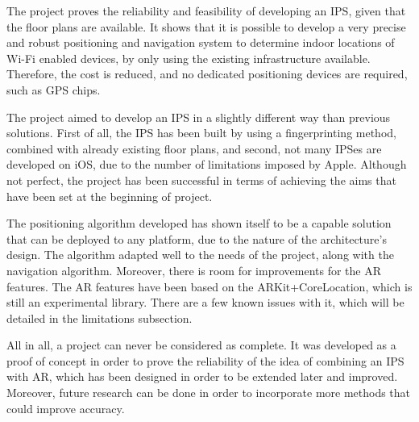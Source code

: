 The project proves the reliability and feasibility of developing an IPS, given that the floor plans are available. It shows that it is possible to develop a very precise and robust positioning and navigation system to determine indoor locations of Wi-Fi enabled devices, by only using the existing infrastructure available. Therefore, the cost is reduced, and no dedicated positioning devices are required, such as GPS chips.

The project aimed to develop an IPS in a slightly different way than previous solutions. First of all, the IPS has been built by using a fingerprinting method, combined with already existing floor plans, and second, not many IPSes are developed on iOS, due to the number of limitations imposed by Apple. Although not perfect, the project has been successful in terms of achieving the aims that have been set at the beginning of project. 

The positioning algorithm developed has shown itself to be a capable solution that can be deployed to any platform, due to the nature of the architecture's design. The algorithm adapted well to the needs of the project, along with the navigation algorithm. Moreover, there is room for improvements for the AR features. The AR features have been based on the ARKit+CoreLocation, which is still an experimental library. There are a few known issues with it, which will be detailed in the limitations subsection.

All in all, a project can never be considered as complete. It was developed as a proof of concept in order to prove the reliability of the idea of combining an IPS with AR, which has been designed in order to be extended later and improved. Moreover, future research can be done in order to incorporate more methods that could improve accuracy.


